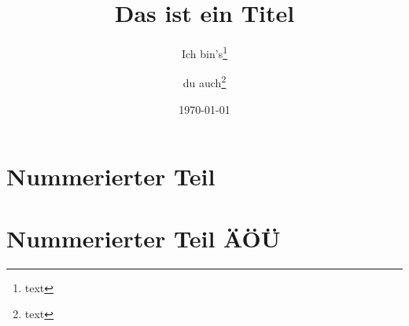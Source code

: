 \documentclass[ngerman,
cd=full,
chapterprefix=true,
chapterpage
]{tudscrreprt}
\begin{document}
\providecommand*\TUDoptions[1]{}
\makeatletter

\date{\today}
\title{Das ist ein Titel}
\author{Ich bin's\thanks{text}\and du auch\thanks{text}}








\chapter{Nummerierter Teil}
\blindtext

\chapter*{Nummerierter Teil ÄÖÜ}
\blindtext
\end{document}
